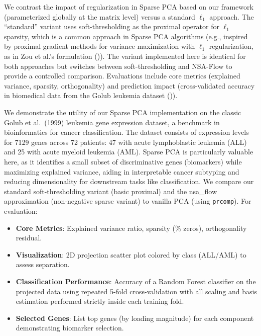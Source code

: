 \documentclass[
]{article}
\begin{document}
We contrast the impact of regularization in Sparse PCA based on our framework (parameterized globally at the matrix level) versus a standard \(\ell_1\) approach. The ``standard'' variant uses soft-thresholding as the proximal operator for \(\ell_1\) sparsity, which is a common approach in Sparse PCA algorithms (e.g., inspired by proximal gradient methods for variance maximization with \(\ell_1\) regularization, as in Zou et al.'s formulation ()). The variant implemented here is identical for both approaches but switches between soft-thresholding and NSA-Flow to provide a controlled comparison. Evaluations include core metrics (explained variance, sparsity, orthogonality) and prediction impact (cross-validated accuracy in biomedical data from the Golub leukemia dataset ()).

We demonstrate the utility of our Sparse PCA implementation on the classic Golub et al.~(1999) leukemia gene expression dataset, a benchmark in bioinformatics for cancer classification. The dataset consists of expression levels for 7129 genes across 72 patients: 47 with acute lymphoblastic leukemia (ALL) and 25 with acute myeloid leukemia (AML). Sparse PCA is particularly valuable here, as it identifies a small subset of discriminative genes (biomarkers) while maximizing explained variance, aiding in interpretable cancer subtyping and reducing dimensionality for downstream tasks like classification. We compare our standard soft-thresholding variant (basic proximal) and the nsa\_flow approximation (non-negative sparse variant) to vanilla PCA (using \texttt{prcomp}). For evaluation:

\begin{itemize}
\item
  \textbf{Core Metrics}: Explained variance ratio, sparsity (\% zeros), orthogonality residual.
\item
  \textbf{Visualization}: 2D projection scatter plot colored by class (ALL/AML) to assess separation.
\item
  \textbf{Classification Performance}: Accuracy of a Random Forest classifier on the projected data using repeated 5-fold cross-validation with all scaling and basis estimation performed strictly inside each training fold.
\item
  \textbf{Selected Genes}: List top genes (by loading magnitude) for each component demonstrating biomarker selection.
\end{itemize}
\end{document}
